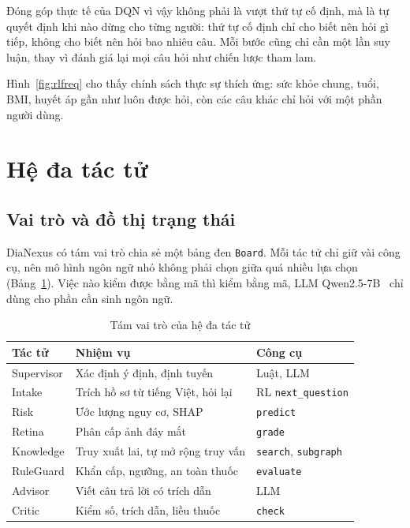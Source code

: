 Đóng góp thực tế của DQN vì vậy không phải là vượt thứ tự cố định, mà là tự quyết định khi nào dừng cho từng người: thứ tự cố định chỉ cho biết nên hỏi gì tiếp, không cho biết nên hỏi bao nhiêu câu. Mỗi bước cũng chỉ cần một lần suy luận, thay vì đánh giá lại mọi câu hỏi như chiến lược tham lam.

Hình~\ref{fig:rlfreq} cho thấy chính sách thực sự thích ứng: sức khỏe chung, tuổi, BMI, huyết áp gần như luôn được hỏi, còn các câu khác chỉ hỏi với một phần người dùng.


\section{Hệ đa tác tử}

\subsection{Vai trò và đồ thị trạng thái}

DiaNexus có tám vai trò chia sẻ một bảng đen \texttt{Board}. Mỗi tác tử chỉ giữ vài công cụ, nên mô hình ngôn ngữ nhỏ không phải chọn giữa quá nhiều lựa chọn (Bảng~\ref{tab:vaitro}). Việc nào kiểm được bằng mã thì kiểm bằng mã, LLM Qwen2.5-7B~\cite{qwen} chỉ dùng cho phần cần sinh ngôn ngữ.

\begin{table}[!htbp]\centering\caption{Tám vai trò của hệ đa tác tử}\label{tab:vaitro}
\small\setlength{\tabcolsep}{4pt}\begin{tabular}{@{}lp{6.3cm}l@{}}\toprule
\textbf{Tác tử} & \textbf{Nhiệm vụ} & \textbf{Công cụ}\\\midrule
Supervisor & Xác định ý định, định tuyến & Luật, LLM\\
Intake & Trích hồ sơ từ tiếng Việt, hỏi lại & RL \texttt{next\_question}\\
Risk & Ước lượng nguy cơ, SHAP & \texttt{predict}\\
Retina & Phân cấp ảnh đáy mắt & \texttt{grade}\\
Knowledge & Truy xuất lai, tự mở rộng truy vấn & \texttt{search}, \texttt{subgraph}\\
RuleGuard & Khẩn cấp, ngưỡng, an toàn thuốc & \texttt{evaluate}\\
Advisor & Viết câu trả lời có trích dẫn & LLM\\
Critic & Kiểm số, trích dẫn, liều thuốc & \texttt{check}\\\bottomrule
\end{tabular}\end{table}

